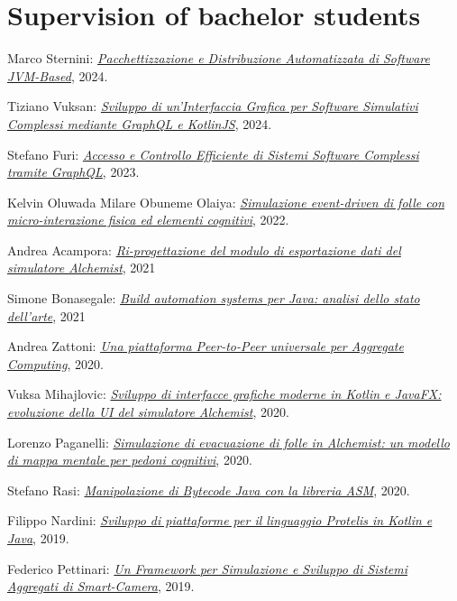 \section{Supervision of bachelor students}
\vspace{-1em}
\begin{innerlist}
    \item Marco Sternini: \href{http://amslaurea.unibo.it/31694/}{\textit{Pacchettizzazione e Distribuzione Automatizzata di Software JVM-Based}}, 2024.
    \item Tiziano Vuksan: \href{http://amslaurea.unibo.it/31688/}{\textit{Sviluppo di un'Interfaccia Grafica per Software Simulativi Complessi mediante GraphQL e KotlinJS}}, 2024.
    \item Stefano Furi: \href{http://amslaurea.unibo.it/30280/}{\textit{Accesso e Controllo Efficiente di Sistemi Software Complessi tramite GraphQL}}, 2023.
    \item Kelvin Oluwada Milare Obuneme Olaiya: \href{http://amslaurea.unibo.it/26455/}{\textit{Simulazione event-driven di folle con micro-interazione fisica ed elementi cognitivi}}, 2022.
    \item Andrea Acampora: \href{https://amslaurea.unibo.it/24704/}{\textit{Ri-progettazione del modulo di esportazione dati del simulatore Alchemist}}, 2021
    \item Simone Bonasegale: \href{https://amslaurea.unibo.it/23316/}{\textit{Build automation systems per Java: analisi dello stato dell'arte}}, 2021
    \item Andrea Zattoni: \href{https://archive.ph/CnUXg}{\textit{Una piattaforma Peer-to-Peer universale per Aggregate Computing}}, 2020.
    \item Vuksa Mihajlovic: \href{http://amslaurea.unibo.it/21648/}{\textit{Sviluppo di interfacce grafiche moderne in Kotlin e JavaFX: evoluzione della UI del simulatore Alchemist}}, 2020.
    \item Lorenzo Paganelli: \href{https://amslaurea.unibo.it/20540/}{\textit{Simulazione di evacuazione di folle in Alchemist: un modello di mappa mentale per pedoni cognitivi}}, 2020.
    \item Stefano Rasi: \href{https://amslaurea.unibo.it/20505/}{\textit{Manipolazione di Bytecode Java con la libreria ASM}}, 2020.
    \item Filippo Nardini: \href{https://amslaurea.unibo.it/19778/}{\textit{Sviluppo di piattaforme per il linguaggio Protelis in Kotlin e Java}}, 2019.
    \item Federico Pettinari: \href{https://amslaurea.unibo.it/19092/}{\textit{Un Framework per Simulazione e Sviluppo di Sistemi Aggregati di Smart-Camera}}, 2019.

\end{innerlist}
